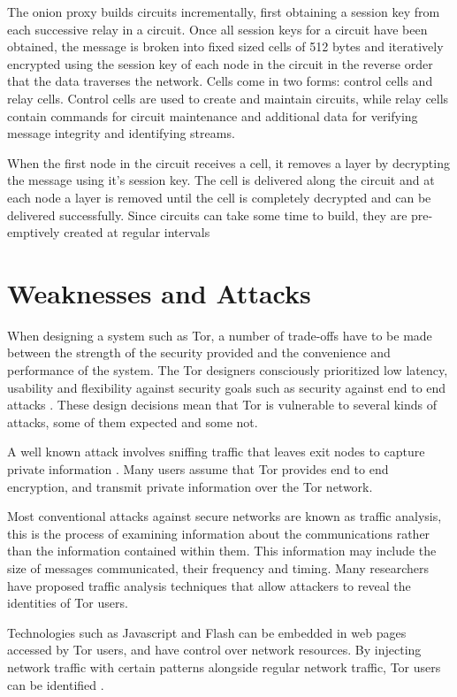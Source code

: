 \documentclass[conference]{IEEEtran}
\begin{document}
The onion proxy builds circuits incrementally, first obtaining a session key
from each successive relay in a circuit. Once all session keys for a circuit
have been obtained, the message is broken into fixed sized cells of 512 bytes
and iteratively encrypted using the session key of each node in the circuit in
the reverse order that the data traverses the network. Cells come in two forms:
control cells and relay cells. Control cells are used to create and maintain
circuits, while relay cells contain commands for circuit maintenance and
additional data for verifying message integrity and identifying streams.

When the first node in the circuit receives a cell, it removes a layer by
decrypting the message using it's session key. The cell is delivered along the
circuit and at each node a layer is removed until the cell is completely
decrypted and can be delivered successfully. Since circuits can take some time
to build, they are pre-emptively created at regular intervals

\section{Weaknesses and Attacks}

When designing a system such as Tor, a number of trade-offs have to be made
between the strength of the security provided and the convenience and
performance of the system. The Tor designers consciously prioritized low
latency, usability and flexibility against security goals such as security
against end to end attacks \parencite[4]{Dingledine:2004p314}. These design
decisions mean that Tor is vulnerable to several kinds of attacks, some of them
expected and some not.

A well known attack involves sniffing traffic that leaves exit nodes to
capture private information \parencite{website:tor-password-leak}. Many users
assume that Tor provides end to end encryption, and transmit private information
over the Tor network.

Most conventional attacks against secure networks are known as traffic analysis,
this is the process of examining information about the communications rather
than the information contained within them. This information may include the
size of messages communicated, their frequency and timing. Many researchers have
proposed traffic analysis techniques that allow attackers to reveal the
identities of Tor users.

Technologies such as Javascript and Flash can be embedded in web pages accessed
by Tor users, and have control over network resources. By injecting network
traffic with certain patterns alongside regular network traffic, Tor users can
be identified \parencite{Abbott:2007p298}.
\end{document}
